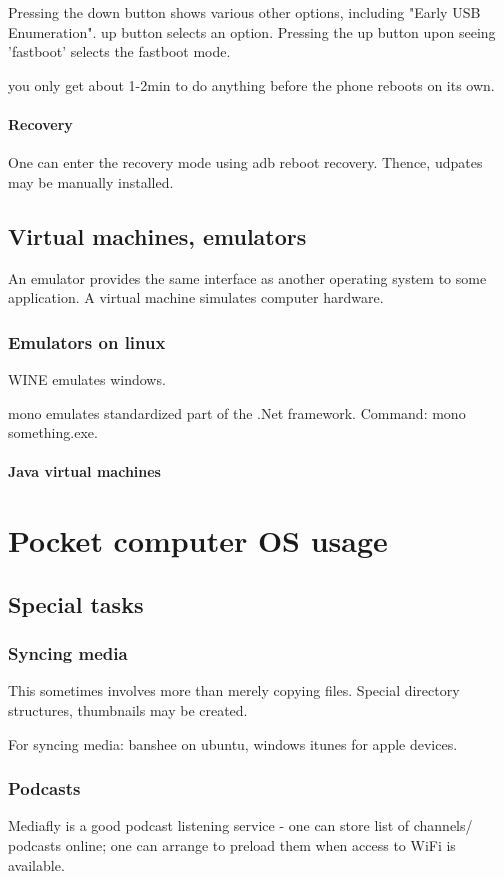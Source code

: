 \documentclass[oneside, article]{memoir}
\begin{document}
Pressing the down button shows various other options, including "Early USB Enumeration". up button selects an option. Pressing the up button upon seeing 'fastboot' selects the fastboot mode.

you only get about 1-2min to do anything before the phone reboots on its own. \chk

\subsubsection{Recovery}
One can enter the recovery mode using adb reboot recovery. Thence, udpates may be manually installed.

\section{Virtual machines, emulators}
An emulator provides the same interface as another operating system to some application. A virtual machine simulates computer hardware.

\subsection{Emulators on linux}
WINE emulates windows.

mono emulates standardized part of the .Net framework. Command: mono something.exe.

\subsubsection{Java virtual machines}
\tbc

\chapter{Pocket computer OS usage}
\section{Special tasks}
\subsection{Syncing media}
This sometimes involves more than merely copying files. Special directory structures, thumbnails may be created.

For syncing media: banshee on ubuntu, windows itunes for apple devices.



\subsection{Podcasts}
Mediafly is a good podcast listening service - one can store list of channels/ podcasts online; one can arrange to preload them when access to WiFi is  available.
\end{document}
